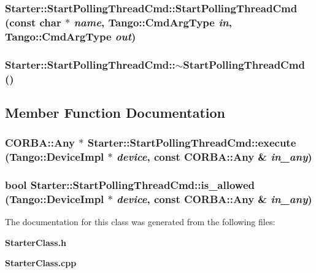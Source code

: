 \subsubsection{\setlength{\rightskip}{0pt plus 5cm}Starter::Start\-Polling\-Thread\-Cmd::Start\-Polling\-Thread\-Cmd (const char $\ast$ {\em name}, Tango::Cmd\-Arg\-Type {\em in}, Tango::Cmd\-Arg\-Type {\em out})}\label{classStarter_1_1StartPollingThreadCmd_a1}


\subsubsection{\setlength{\rightskip}{0pt plus 5cm}Starter::Start\-Polling\-Thread\-Cmd::$\sim$Start\-Polling\-Thread\-Cmd ()\hspace{0.3cm}{\tt  [inline]}}\label{classStarter_1_1StartPollingThreadCmd_a2}




\subsection{Member Function Documentation}
\subsubsection{\setlength{\rightskip}{0pt plus 5cm}CORBA::Any $\ast$ Starter::Start\-Polling\-Thread\-Cmd::execute (Tango::Device\-Impl $\ast$ {\em device}, const CORBA::Any \& {\em in\_\-any})\hspace{0.3cm}{\tt  [virtual]}}\label{classStarter_1_1StartPollingThreadCmd_a4}


\subsubsection{\setlength{\rightskip}{0pt plus 5cm}bool Starter::Start\-Polling\-Thread\-Cmd::is\_\-allowed (Tango::Device\-Impl $\ast$ {\em device}, const CORBA::Any \& {\em in\_\-any})\hspace{0.3cm}{\tt  [virtual]}}\label{classStarter_1_1StartPollingThreadCmd_a3}




The documentation for this class was generated from the following files:\begin{CompactItemize}
\item 
{\bf Starter\-Class.h}\item 
{\bf Starter\-Class.cpp}\end{CompactItemize}
